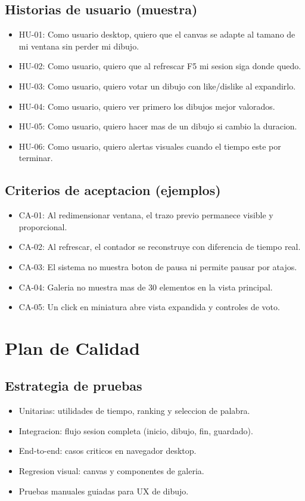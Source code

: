 \documentclass[12pt,a4paper]{article}
\begin{document}
\subsection{Historias de usuario (muestra)}
\begin{itemize}
  \item HU-01: Como usuario desktop, quiero que el canvas se adapte al tamano de mi ventana sin perder mi dibujo.
  \item HU-02: Como usuario, quiero que al refrescar F5 mi sesion siga donde quedo.
  \item HU-03: Como usuario, quiero votar un dibujo con like/dislike al expandirlo.
  \item HU-04: Como usuario, quiero ver primero los dibujos mejor valorados.
  \item HU-05: Como usuario, quiero hacer mas de un dibujo si cambio la duracion.
  \item HU-06: Como usuario, quiero alertas visuales cuando el tiempo este por terminar.
\end{itemize}

\subsection{Criterios de aceptacion (ejemplos)}
\begin{itemize}
  \item CA-01: Al redimensionar ventana, el trazo previo permanece visible y proporcional.
  \item CA-02: Al refrescar, el contador se reconstruye con diferencia de tiempo real.
  \item CA-03: El sistema no muestra boton de pausa ni permite pausar por atajos.
  \item CA-04: Galeria no muestra mas de 30 elementos en la vista principal.
  \item CA-05: Un click en miniatura abre vista expandida y controles de voto.
\end{itemize}

\section{Plan de Calidad}
\subsection{Estrategia de pruebas}
\begin{itemize}
  \item Unitarias: utilidades de tiempo, ranking y seleccion de palabra.
  \item Integracion: flujo sesion completa (inicio, dibujo, fin, guardado).
  \item End-to-end: casos criticos en navegador desktop.
  \item Regresion visual: canvas y componentes de galeria.
  \item Pruebas manuales guiadas para UX de dibujo.
\end{itemize}
\end{document}
